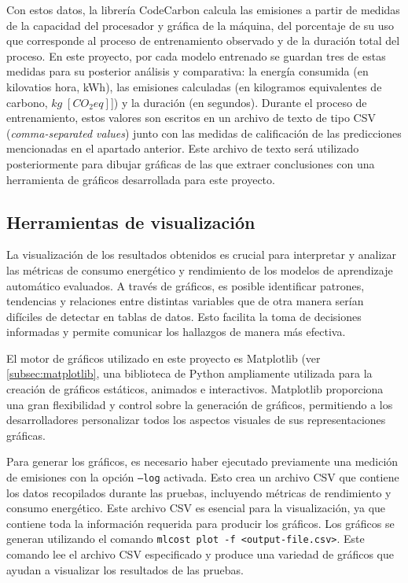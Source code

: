 Con estos datos, la librería CodeCarbon calcula las emisiones a partir de medidas de la capacidad del procesador y gráfica de la máquina, del porcentaje de su uso que corresponde al proceso de entrenamiento observado y de la duración total del proceso. En este proyecto, por cada modelo entrenado se guardan tres de estas medidas para su posterior análisis y comparativa: la energía consumida (en kilovatios hora, \unit{kWh}), las emisiones calculadas (en kilogramos equivalentes de carbono, $\unit{kg\;[CO_2eq]}$]) y la duración (en segundos). Durante el proceso de entrenamiento, estos valores son escritos en un archivo de texto de tipo CSV (\emph{comma-separated values}) junto con las medidas de calificación de las predicciones mencionadas en el apartado anterior. Este archivo de texto será utilizado posteriormente para dibujar gráficas de las que extraer conclusiones con una herramienta de gráficos desarrollada para este proyecto.


\subsection{Herramientas de visualización}

La visualización de los resultados obtenidos es crucial para interpretar y analizar las métricas de consumo energético y rendimiento de los modelos de aprendizaje automático evaluados. A través de gráficos, es posible identificar patrones, tendencias y relaciones entre distintas variables que de otra manera serían difíciles de detectar en tablas de datos. Esto facilita la toma de decisiones informadas y permite comunicar los hallazgos de manera más efectiva.

El motor de gráficos utilizado en este proyecto es Matplotlib (ver \ref{subsec:matplotlib}, una biblioteca de Python ampliamente utilizada para la creación de gráficos estáticos, animados e interactivos. Matplotlib proporciona una gran flexibilidad y control sobre la generación de gráficos, permitiendo a los desarrolladores personalizar todos los aspectos visuales de sus representaciones gráficas.

Para generar los gráficos, es necesario haber ejecutado previamente una medición de emisiones con la opción \texttt{--log} activada. Esto crea un archivo CSV que contiene los datos recopilados durante las pruebas, incluyendo métricas de rendimiento y consumo energético. Este archivo CSV es esencial para la visualización, ya que contiene toda la información requerida para producir los gráficos. Los gráficos se generan utilizando el comando \texttt{mlcost plot -f <output-file.csv>}. Este comando lee el archivo CSV especificado y produce una variedad de gráficos que ayudan a visualizar los resultados de las pruebas.

